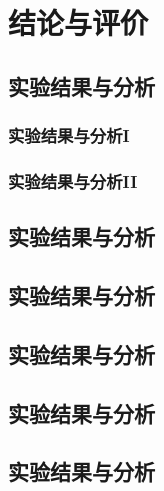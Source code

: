 \documentclass{USTBBook}
\begin{document}
\part{结论与评价}
\ToggleSectionStyle

\chapter{实验结果与分析}
\section{实验结果与分析I}
\zhlipsum[14]

\section{实验结果与分析II}
\zhlipsum[14]

\chapter{实验结果与分析}
\zhlipsum[14]

\chapter{实验结果与分析}
\zhlipsum[14]

\chapter{实验结果与分析}
\zhlipsum[14]

\chapter{实验结果与分析}
\zhlipsum[14]

\chapter{实验结果与分析}
\zhlipsum[14]

\backmatter
\end{document}
